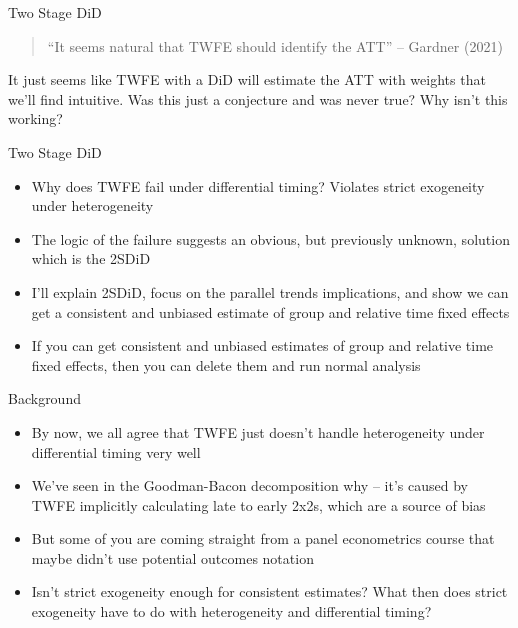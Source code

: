 \documentclass{beamer}
\begin{document}
\begin{frame}{Two Stage DiD}

\begin{quote}
``It seems natural that TWFE should identify the ATT'' -- Gardner (2021)
\end{quote}

\bigskip

It just seems like TWFE with a DiD will estimate the ATT with weights that we'll find intuitive.  Was this just a conjecture and was never true?  Why isn't this working?

\end{frame}



\begin{frame}{Two Stage DiD}

\begin{itemize}
\item Why does TWFE fail under differential timing? Violates strict exogeneity under heterogeneity
\item The logic of the failure suggests an obvious, but previously unknown, solution which is the 2SDiD
\item I'll explain 2SDiD, focus on the parallel trends implications, and show we can get a consistent and unbiased estimate of group and relative time fixed effects
\item If you can get consistent and unbiased estimates of group and relative time fixed effects, then you can delete them and run normal analysis
\end{itemize}

\end{frame}

\begin{frame}{Background}

\begin{itemize}
\item By now, we all agree that TWFE just doesn't handle heterogeneity under differential timing very well
\item We've seen in the Goodman-Bacon decomposition why -- it's caused by TWFE implicitly calculating late to early 2x2s, which are a source of bias
\item But some of you are coming straight from a panel econometrics course that maybe didn't use potential outcomes notation
\item Isn't strict exogeneity enough for consistent estimates?  What then does strict exogeneity have to do with heterogeneity and differential timing?
\end{itemize}

\end{frame}
\end{document}
